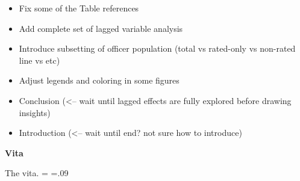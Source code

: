\documentclass[12pt,letterpaper,toc=flat,oneside]{report}
\providecommand{\tightlist}{%
\setlength{\itemsep}{0pt}\setlength{\parskip}{0pt}}
\theoremstyle{definition}
\theoremstyle{definition}
\theoremstyle{definition}
\theoremstyle{remark}
\begin{document}
\begin{itemize}
\tightlist
\item
  Fix some of the Table references
\item
  Add complete set of lagged variable analysis
\item
  Introduce subsetting of officer population (total vs rated-only vs
  non-rated line vs etc)
\item
  Adjust legends and coloring in some figures
\item
  Conclusion (\textless{}-- wait until lagged effects are fully explored
  before drawing insights)
\item
  Introduction (\textless{}-- wait until end? not sure how to introduce)
\end{itemize}
\newpage
\singlespace

    \newpage
    \begin{center}
	\Large\bfseries Vita
    \end{center}
    \vspace{2em}
    \doublespacing
    The vita.
    \newpage
\pagestyle{empty}
\singlespace
{} 
\newdimen\rhI       {}\textheight
\newdimen\rhII      {}\textheight
\newdimen\rhIII     {}\textheight
\newdimen\rhIV      {}\textheight
\newdimen\rhV       \rhV=\rhIV
\newdimen\rhVI      \rhVI=.09\textheight
\newdimen\rhVII     {}\textheight
\newdimen\rhVIII    {}\textheight
\newdimen\rhIX      {}\textheight
\newdimen\rhX       {}\textheight
\newdimen\rhXI      {}\textheight
\newdimen\rhXII     {}\textheight
\end{document}
